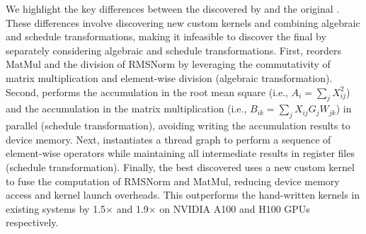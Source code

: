 We highlight the key differences between the \graph discovered by \sys and the original \graph.
These differences involve discovering new custom kernels and combining algebraic and schedule transformations, making it infeasible to discover the final \graph by separately considering algebraic and schedule transformations.
First, \sys reorders MatMul and the division of RMSNorm by leveraging the commutativity of matrix multiplication and element-wise division (algebraic transformation).
Second, \sys performs the accumulation in the root mean square (i.e., $A_i = \sum_j X_{ij}^2$) and the accumulation in the matrix multiplication (i.e., $B_{ik} = \sum_j X_{ij} G_j W_{jk}$) in parallel (schedule transformation), avoiding writing the accumulation results to device memory.
Next, \sys instantiates a thread graph to perform a sequence of element-wise operators while maintaining all intermediate results in register files (schedule transformation).
Finally, the best discovered \graph uses a new custom kernel to fuse the computation of RMSNorm and MatMul, reducing device memory access and kernel launch overheads. This \graph outperforms the hand-written kernels in existing systems by 1.5$\times$ and 1.9$\times$ on NVIDIA A100 and H100 GPUs respectively.
